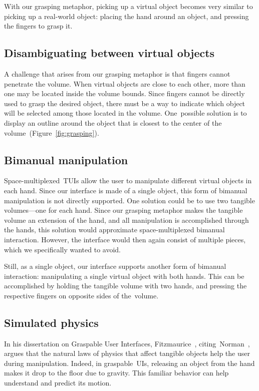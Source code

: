 \documentclass{vgtc}                         \havecopyrightspacefalse
\begin{document}
With our grasping metaphor, picking up a virtual object becomes very similar to picking up a real-world object: placing the hand around an object, and pressing the fingers to grasp it.

\subsection{Disambiguating between virtual objects}

A challenge that arises from our grasping metaphor is that fingers cannot penetrate the volume. When virtual objects are close to each other, more than one may be located inside the volume bounds. Since fingers cannot be directly used to grasp the desired object, there must be a way to indicate which object will be selected among those located in the volume. One~possible solution is to display an outline around the object that is closest to the center of the volume~(Figure~\ref{fig:grasping}).

\subsection{Bimanual manipulation}

Space-multiplexed~TUIs allow the user to manipulate different virtual objects in each hand. Since our interface is made of a single object, this form of bimanual manipulation is not directly supported. One solution could be to use two tangible volumes---one for each hand. Since our grasping metaphor makes the tangible volume an extension of the hand, and all manipulation is accomplished through the hands, this solution would approximate space-multiplexed bimanual interaction. However, the interface would then again consist of multiple pieces, which we specifically wanted to avoid.

Still, as a single object, our interface supports another form of bimanual interaction: manipulating a single virtual object with both hands. This can be accomplished by holding the tangible volume with two hands, and pressing the respective fingers on opposite sides of the~volume.

\subsection{Simulated physics}

In his dissertation on Graspable User Interfaces, Fitzmaurice~\cite{fitzmaurice96}, citing~Norman~\cite{norman93}, argues that the natural laws of physics that affect tangible objects help the user during manipulation. Indeed, in graspable~UIs, releasing an object from the hand makes it drop to the floor due to gravity. This familiar behavior can help understand and predict its motion.
\end{document}
